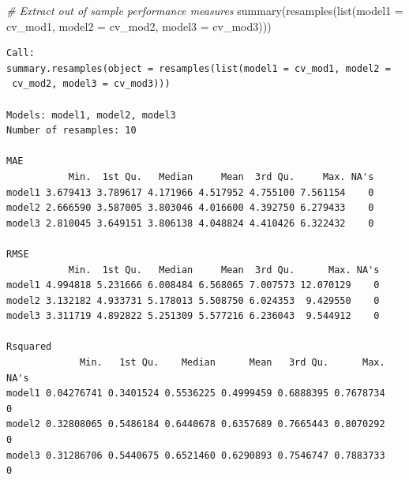 \documentclass[
  8pt,
  ignorenonframetext,
]{beamer}
\newenvironment{Shaded}{\begin{snugshade}}{\end{snugshade}}
\newcommand{\AttributeTok}[1]{\textcolor[rgb]{0.77,0.63,0.00}{#1}}
\newcommand{\CommentTok}[1]{\textcolor[rgb]{0.56,0.35,0.01}{\textit{#1}}}
\newcommand{\FunctionTok}[1]{\textcolor[rgb]{0.00,0.00,0.00}{#1}}
\newcommand{\NormalTok}[1]{#1}
\begin{document}
\begin{frame}[fragile]
\footnotesize

\begin{Shaded}
\begin{Highlighting}[]
\CommentTok{\# Extract out of sample performance measures}
\FunctionTok{summary}\NormalTok{(}\FunctionTok{resamples}\NormalTok{(}\FunctionTok{list}\NormalTok{(}\AttributeTok{model1 =}\NormalTok{ cv\_mod1, }\AttributeTok{model2 =}\NormalTok{ cv\_mod2,}
                       \AttributeTok{model3 =}\NormalTok{ cv\_mod3)))}
\end{Highlighting}
\end{Shaded}

\begin{verbatim}
Call:
summary.resamples(object = resamples(list(model1 = cv_mod1, model2 =
 cv_mod2, model3 = cv_mod3)))

Models: model1, model2, model3 
Number of resamples: 10 

MAE 
           Min.  1st Qu.   Median     Mean  3rd Qu.     Max. NA's
model1 3.679413 3.789617 4.171966 4.517952 4.755100 7.561154    0
model2 2.666590 3.587005 3.803046 4.016600 4.392750 6.279433    0
model3 2.810045 3.649151 3.806138 4.048824 4.410426 6.322432    0

RMSE 
           Min.  1st Qu.   Median     Mean  3rd Qu.      Max. NA's
model1 4.994818 5.231666 6.008484 6.568065 7.007573 12.070129    0
model2 3.132182 4.933731 5.178013 5.508750 6.024353  9.429550    0
model3 3.311719 4.892822 5.251309 5.577216 6.236043  9.544912    0

Rsquared 
             Min.   1st Qu.    Median      Mean   3rd Qu.      Max. NA's
model1 0.04276741 0.3401524 0.5536225 0.4999459 0.6888395 0.7678734    0
model2 0.32808065 0.5486184 0.6440678 0.6357689 0.7665443 0.8070292    0
model3 0.31286706 0.5440675 0.6521460 0.6290893 0.7546747 0.7883733    0
\end{verbatim}

\normalsize
\end{frame}
\end{document}
